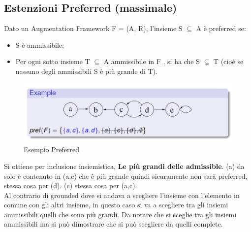 \subsection{Estenzioni Preferred (massimale)}
Dato un Augmentation Framework F = (A, R), l’insieme S $\subseteq$ A è preferred se:
\begin{itemize}
    \item S è ammissibile;
    \item Per ogni sotto insieme T $\subseteq$ A ammissibile in F , si ha che S $\subsetneq$ T (cioè se nessuno degli ammissibili S è più grande di T).
\end{itemize}
\begin{figure}[htp]
	\centering
    \includegraphics[width=12cm, keepaspectratio]{img/Cap6/prefered.png}
    \caption{Esempio Preferred}
\end{figure}
Si ottiene per inclusione insiemistica, \textbf{Le più grandi delle admissible}. (a) da solo è contenuto in (a,c) che è più grande quindi sicuramente non sarà preferred, stessa cosa per (d). (c) stessa cosa per (a,c).
\\Al contrario di grounded dove si andava a scegliere l’insieme con l’elemento in
comune con gli altri insieme, in questo caso si va a scegliere tra gli insiemi ammissibili
quelli che sono più grandi. Da notare che si sceglie tra gli insiemi ammissibili ma si
può dimostrare che si può scegliere da quelli complete.

